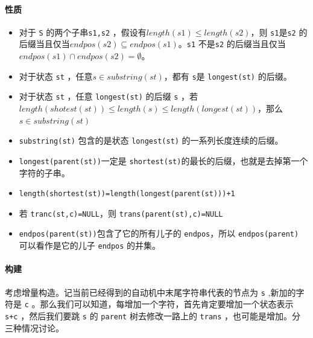 \documentclass[UTF-8]{ctexart}
\begin{document}
	\paragraph{性质}
	
	\begin{itemize}
		\item 对于 \texttt{S} 的两个子串\texttt{s1,s2} ，假设有$length(s1) \le length(s2)$，则 \texttt{s1}是\texttt{s2} 的后缀当且仅当$endpos(s2) \subseteq endpos(s1)$。\texttt{s1} 不是\texttt{s2} 的后缀当且仅当$endpos(s1) \cap endpos(s2)= \emptyset$。
		\item 对于状态 \texttt{st} ，任意$s \in substring(st)$，都有 \texttt{s}是 \texttt{longest(st)} 的后缀。
		\item 对于状态 \texttt{st} ，任意 \texttt{longest(st)} 的后缀 \texttt{s} ，若$length(shotest(st)) \le length(s) \le length(longest(st))$，那么$s \in substring(st)$
		\item  \texttt{substring(st)} 包含的是状态 \texttt{longest(st)} 的一系列长度连续的后缀。
		\item  \texttt{longest(parent(st))}一定是 \texttt{shortest(st)}的最长的后缀，也就是去掉第一个字符的子串。
		\item  \texttt{length(shortest(st))=length(longest(parent(st)))+1}
		\item 若 \texttt{tranc(st,c)=NULL}，则 \texttt{trans(parent(st),c)=NULL}
		\item  \texttt{endpos(parent(st))}包含了它的所有儿子的 \texttt{endpos}，所以 \texttt{endpos(parent)} 可以看作是它的儿子 \texttt{endpos} 的并集。
	\end{itemize}
	
	\paragraph{构建} 考虑增量构造。记当前已经得到的自动机中末尾字符串代表的节点为 \texttt{s} ,新加的字符是 \texttt{c} 。那么我们可以知道，每增加一个字符，首先肯定要增加一个状态表示 \texttt{s+c} ，然后我们要跳 \texttt{s} 的 \texttt{parent} 树去修改一路上的 \texttt{trans} ，也可能是增加。分三种情况讨论。
	
\end{document}
